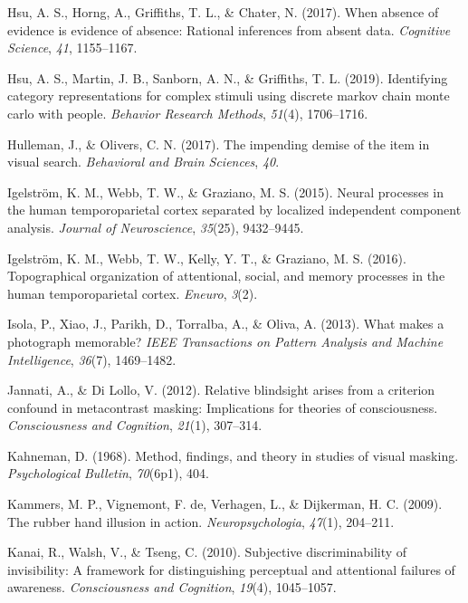 \documentclass[12pt,twoside]{reedthesis}
\newenvironment{CSLReferences}%
  {}%
  {\par}
\begin{document}
\begin{CSLReferences}{1}{0}
\leavevmode\hypertarget{ref-hsu2017absence}{}%
Hsu, A. S., Horng, A., Griffiths, T. L., \& Chater, N. (2017). When absence of evidence is evidence of absence: Rational inferences from absent data. \emph{Cognitive Science}, \emph{41}, 1155--1167.

\leavevmode\hypertarget{ref-hsu2019identifying}{}%
Hsu, A. S., Martin, J. B., Sanborn, A. N., \& Griffiths, T. L. (2019). Identifying category representations for complex stimuli using discrete markov chain monte carlo with people. \emph{Behavior Research Methods}, \emph{51}(4), 1706--1716.

\leavevmode\hypertarget{ref-hulleman2017impending}{}%
Hulleman, J., \& Olivers, C. N. (2017). The impending demise of the item in visual search. \emph{Behavioral and Brain Sciences}, \emph{40}.

\leavevmode\hypertarget{ref-igelstrom2015neural}{}%
Igelström, K. M., Webb, T. W., \& Graziano, M. S. (2015). Neural processes in the human temporoparietal cortex separated by localized independent component analysis. \emph{Journal of Neuroscience}, \emph{35}(25), 9432--9445.

\leavevmode\hypertarget{ref-igelstrom2016topographical}{}%
Igelström, K. M., Webb, T. W., Kelly, Y. T., \& Graziano, M. S. (2016). Topographical organization of attentional, social, and memory processes in the human temporoparietal cortex. \emph{Eneuro}, \emph{3}(2).

\leavevmode\hypertarget{ref-isola2013makes}{}%
Isola, P., Xiao, J., Parikh, D., Torralba, A., \& Oliva, A. (2013). What makes a photograph memorable? \emph{IEEE Transactions on Pattern Analysis and Machine Intelligence}, \emph{36}(7), 1469--1482.

\leavevmode\hypertarget{ref-jannati2012relative}{}%
Jannati, A., \& Di Lollo, V. (2012). Relative blindsight arises from a criterion confound in metacontrast masking: Implications for theories of consciousness. \emph{Consciousness and Cognition}, \emph{21}(1), 307--314.

\leavevmode\hypertarget{ref-kahneman1968method}{}%
Kahneman, D. (1968). Method, findings, and theory in studies of visual masking. \emph{Psychological Bulletin}, \emph{70}(6p1), 404.

\leavevmode\hypertarget{ref-kammers2009rubber}{}%
Kammers, M. P., Vignemont, F. de, Verhagen, L., \& Dijkerman, H. C. (2009). The rubber hand illusion in action. \emph{Neuropsychologia}, \emph{47}(1), 204--211.

\leavevmode\hypertarget{ref-kanai2010subjective}{}%
Kanai, R., Walsh, V., \& Tseng, C. (2010). Subjective discriminability of invisibility: A framework for distinguishing perceptual and attentional failures of awareness. \emph{Consciousness and Cognition}, \emph{19}(4), 1045--1057.


\end{CSLReferences}
\end{document}
